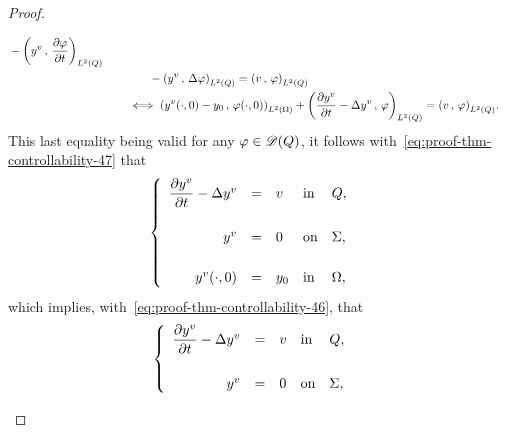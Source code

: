 \begin{proof}
\begin{enumerate}
\begin{equation*}
\begin{split}
{                    } - \scalaireq{%
                        y^{v}
                    }{%
                        \primetemps{\vphi}
                    }\\
                    &\qquad\qquad - \scalaireq{%
                        y^{v}
                    }{%
                        \Delta\vphi{}
                    } = \scalaireq{v}{\vphi}\\
                    &\qquad \iff \scalaireohm{%
                        \condinitiale{y^{v}} - y_{0}
                    }{%
                        \condinitiale{\vphi}
                    } + \scalaireq{%
                        \primetemps{y^{v}} - \Delta y^{v}
                    }{%
                        \vphi{}
                    } = \scalaireq{v}{\vphi}.
                \end{split}
            \end{equation*}
            This last equality being valid for any $\varphi\in\mathscr{D}(Q)$, it
            follows with~\eqref{eq:proof-thm-controllability-47} that
            \begin{equation*}
                \begin{cases}\displaystyle
                    \begin{array}{rclll}
                        \dfrac{\partial{}y^{v}}{\partial{}t} - \Delta y^{v} & = & v &
                        \text{in} & Q,\\
                        \\
                        y^{v} & = & 0 & \text{on} & \Sigma,\\
                        \\
                        {y^{v}}\!\left({\cdot, 0}\right) & = & y_{0} & \text{in} &
                        \Omega,
                    \end{array}
                \end{cases}
            \end{equation*}
            which implies, with~\eqref{eq:proof-thm-controllability-46},
            that
            \begin{equation*}
                \begin{cases}\displaystyle
                    \begin{array}{rclll}
                        \dfrac{\partial{}y^{v}}{\partial{}t} - \Delta y^{v} & = & v &
                        \text{in} & Q,\\
                        \\
                        y^{v} & = & 0 & \text{on} & \Sigma,\\

\end{array}
\end{cases}
\end{equation*}
\end{enumerate}
\end{proof}
